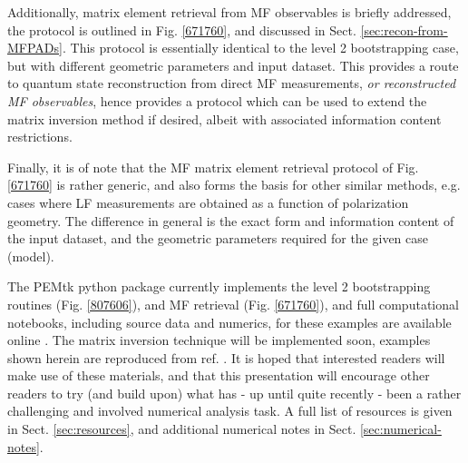 Additionally, matrix element retrieval from MF observables is briefly addressed, the protocol is outlined in Fig. \ref{671760}, and discussed in Sect. \ref{sec:recon-from-MFPADs}. This protocol is essentially identical to the level 2 bootstrapping case, but with different geometric parameters and input dataset. This provides a route to quantum state reconstruction from direct MF measurements, \textit{or reconstructed MF observables}, hence provides a protocol which can be used to extend the matrix inversion method if desired, albeit with associated information content restrictions.

Finally, it is of note that the MF matrix element retrieval protocol of Fig. \ref{671760} is rather generic, and also forms the basis for other similar methods, e.g. cases where LF measurements are obtained as a function of polarization geometry. The difference in general is the exact form and information content of the input dataset, and the geometric parameters required for the given case (model).


The PEMtk python package \cite{hockett2021PEMtkDocs, hockett2021PEMtkGithub} currently implements the level 2 bootstrapping routines (Fig. \ref{807606}), and MF retrieval (Fig. \ref{671760}), and full computational notebooks, including source data and numerics, for these examples are available online \cite{hockett2022MFreconFigshare}. The matrix inversion technique will be implemented soon, examples shown herein are reproduced from ref. \cite{gregory2021MolecularFramePhotoelectron}. It is hoped that interested readers will make use of these materials, and that this presentation will encourage other readers to try (and build upon) what has - up until quite recently - been a rather challenging and involved numerical analysis task. A full list of resources is given in Sect. \ref{sec:resources}, and additional numerical notes in Sect. \ref{sec:numerical-notes}.